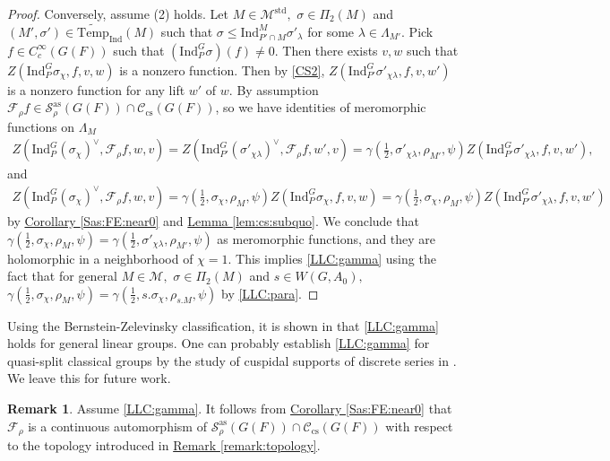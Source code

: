 \documentclass[10pt]{amsart}
\theoremstyle{definition}
\newtheorem{remark}[theorem]{Remark}
\numberwithin{equation}{section}
\numberwithin{equation}{subsection}
\newcommand{\Ind}{\mathrm{Ind}}
\newcommand{\Temp}{\mathrm{Temp}}
\begin{document}
\begin{proof}
Conversely, assume (2) holds. Let $M\in \mathcal{M}^{\mathrm{std}},$ $\sigma\in \Pi_2(M)$ and $(M',\sigma')\in\widetilde{\Temp}_\Ind(M)$ such that $\sigma\leq \Ind_{P'\cap M}^M\sigma'_\lambda$ for some $\lambda\in\Lambda_{M'}$. Pick $f\in C_c^\infty(G(F))$ such that $(\Ind_P^G\sigma)(f)\neq 0.$ Then there exists $v,w$ such that $Z(\Ind_P^G\sigma_\chi,f,v,w)$ is a nonzero function. Then by \eqref{CS2}, $Z(\Ind_{P'}^G\sigma'_{\chi\lambda},f,v,w')$ is a nonzero function for any lift $w'$ of $w$. By assumption $\mathcal{F}_\rho f\in\mathcal{S}^{\mathrm{as}}_{\rho}(G(F))\cap \mathcal{C}_{\mathrm{cs}}(G(F))$, so we have identities of meromorphic functions on $\Lambda_M$
\begin{align*}
    Z(\Ind_P^G(\sigma_\chi)^\vee,\mathcal{F}_\rho f,w,v) = Z(\Ind_{P'}^G(\sigma'_{\chi\lambda})^\vee,\mathcal{F}_\rho f,w',v)=\gamma(\tfrac{1}{2},\sigma'_{\chi\lambda},\rho_{M'},\psi)Z(\Ind_{P'}^G\sigma'_{\chi\lambda},f,v,w'),
\end{align*}
and
\begin{align*}
    Z(\Ind_P^G(\sigma_\chi)^\vee,\mathcal{F}_\rho f,w,v) = \gamma(\tfrac{1}{2},\sigma_\chi,\rho_M,\psi)Z(\Ind_P^G\sigma_\chi,f,v,w) = \gamma(\tfrac{1}{2},\sigma_\chi,\rho_M,\psi)Z(\Ind_{P'}^G\sigma'_{\chi\lambda},f,v,w')
\end{align*}
by \hyperref[Sas:FE:near0]{Corollary \ref{Sas:FE:near0}} and \hyperref[lem:cs:subquo]{Lemma \ref{lem:cs:subquo}}. We conclude that $\gamma(\tfrac{1}{2},\sigma_\chi,\rho_M,\psi) = \gamma(\tfrac{1}{2},\sigma'_{\chi\lambda},\rho_{M'},\psi)$ as meromorphic functions, and they are holomorphic in a neighborhood of $\chi=1$. This implies \eqref{LLC:gamma} using the fact that for general $M\in \mathcal{M},$ $\sigma\in \Pi_2(M)$ and $s\in W(G,A_0),$ $\gamma(\tfrac{1}{2},\sigma_\chi,\rho_M,\psi)=\gamma(\tfrac{1}{2},s.\sigma_\chi,\rho_{s.M},\psi)$ by \eqref{LLC:para}.
\end{proof}

Using the Bernstein-Zelevinsky classification, it is shown in \cite[Proposition 3.3]{DRS} that \eqref{LLC:gamma} holds for general linear groups. One can probably establish \eqref{LLC:gamma} for quasi-split classical groups by the study of cuspidal supports of discrete series in \cite{Moeglin:classicaldiscrete, Moeglin-Tadic,Mok:quasisplitunitary,Xu:quasisplitclassical}. We leave this for future work.

\begin{remark}
    Assume \eqref{LLC:gamma}. It follows from \hyperref[Sas:FE:near0]{Corollary \ref{Sas:FE:near0}} that $\mathcal{F}_\rho$ is a continuous automorphism of $\mathcal{S}^{\mathrm{as}}_{\rho}(G(F))\cap \mathcal{C}_{\mathrm{cs}}(G(F))$ with respect to the topology introduced in \hyperref[remark:topology]{Remark \ref{remark:topology}}.
\end{remark}
\end{document}
